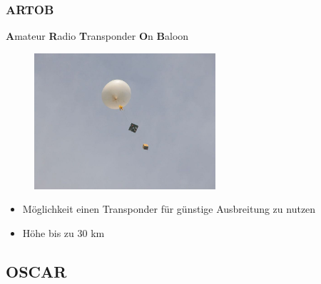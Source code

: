 \begin{frame}
  \frametitle{ARTOB}

  \textbf{A}mateur \textbf{R}adio \textbf{T}ransponder \textbf{O}n \textbf{B}aloon

  \begin{center}
    \begin{figure}
      \includegraphics[width=0.6\textwidth,height=.5\textheight,keepaspectratio]{bv11/Wetterballon_Nutzlast.jpg}
    \end{figure}
  \end{center}

  \begin{itemize}
    \item Möglichkeit einen Transponder für günstige Ausbreitung zu nutzen
    \item Höhe bis zu 30 km
  \end{itemize}


\end{frame}

\subsection{OSCAR}

